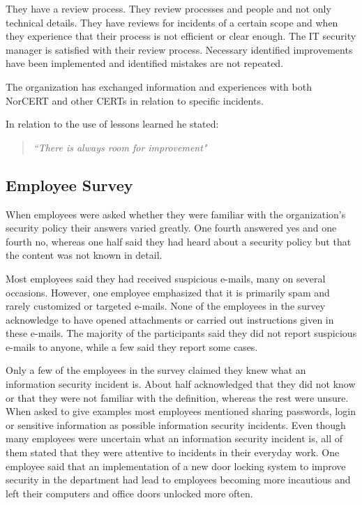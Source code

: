 They have a review process. They review processes and people and not only technical details. They have reviews for incidents of a certain scope and when they experience that their process is not efficient or clear enough. The IT security manager is satisfied with their review process. Necessary identified improvements have been implemented and identified mistakes are not repeated.

The organization has exchanged information and experiences with both \acs{NorCERT} and other \acp{CERT} in relation to specific incidents.

In relation to the use of lessons learned he stated: 

\begin{quote}
\textit{``There is always room for improvement"}
\end{quote}

\subsection{Employee Survey}
When employees were asked whether they were familiar with the organization's security policy their answers varied greatly. One fourth answered yes and one fourth no, whereas one half said they had heard about a security policy but that the content was not known in detail. 

Most employees said they had received suspicious e-mails, many on several occasions. However, one employee emphasized that it is primarily spam and rarely customized or targeted e-mails. None of the employees in the survey acknowledge to have opened attachments or carried out instructions given in these e-mails. The majority of the participants said they did not report suspicious e-mails to anyone, while a few said they report some cases.

Only a few of the employees in the survey claimed they knew what an information security incident is. About half acknowledged that they did not know or that they were not familiar with the definition, whereas the rest were unsure. When asked to give examples most employees mentioned sharing passwords, login or sensitive information as possible information security incidents. Even though many employees were uncertain what an information security incident is, all of them stated that they were attentive to incidents in their everyday work. One employee said that an implementation of a new door locking system to improve security in the department had lead to employees becoming more incautious and left their computers and office doors unlocked more often.

